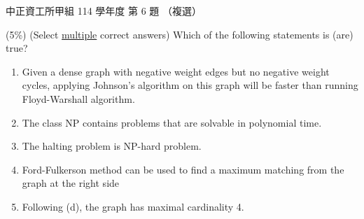 \begin{pastexam}[label={px:ccu-114-swa-06}]{中正資工所甲組 114 學年度 第 6 題}
（複選）

(5\%) (Select \underline{multiple} correct answers) Which of the following statements is (are) true?

\begin{center}
\end{center}
\begin{enumerate}[label=(\alph*)]
\item Given a dense graph with negative weight edges but no negative weight cycles, applying Johnson's
algorithm on this graph will be faster than running Floyd-Warshall algorithm.
\item The class NP contains problems that are solvable in polynomial time.
\item The halting problem is NP-hard problem.
\item Ford-Fulkerson method can be used to find a maximum matching from the graph at the right side
\item Following (d), the graph has maximal cardinality 4.
\end{enumerate}
\end{pastexam}


